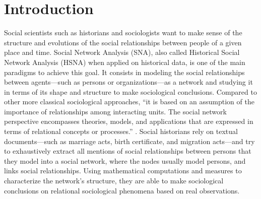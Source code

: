 


\chapter{Introduction}

Social scientists such as historians and sociologists want to make sense of the structure and evolutions of the social relationships between people of a given place and time.
Social Network Analysis (SNA), also called  Historical Social Network Analysis (HSNA) when applied on historical data, is one of the main paradigms to achieve this goal.
It consists in modeling the social relationships between agents---such as persons or organizations---as a network and studying it in terms of its shape and structure to make sociological conclusions.
Compared to other more classical sociological approaches, ``it is based on an assumption of the importance of relationships among interacting units.
The social network perspective encompasses theories, models, and applications that are expressed in terms of relational concepts or processes.'' \cite{wassermanSocialNetworkAnalysis1994}.
Social historians rely on textual documents---such as marriage acts, birth certificate, and migration acts---and try to exhaustively extract all mentions of social relationships between persons that they model into a social network, where the nodes usually model persons, and links social relationships.
Using mathematical computations and measures to characterize the network's structure, they are able to make sociological conclusions on relational sociological phenomena based on real observations.

